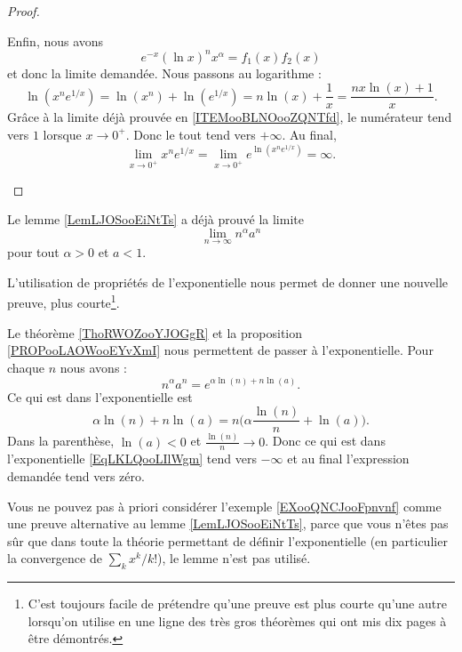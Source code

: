 \begin{proof}
\begin{subproof}
		Enfin, nous avons
		\begin{equation}
			e^{-x}(\ln x)^nx^{\alpha}=f_1(x)f_2(x)
		\end{equation}
		et donc la limite demandée.
		Nous passons au logarithme :
		\begin{equation}
			\ln(x^n e^{1/x})=\ln(x^n)+\ln( e^{1/x})=n\ln(x)+\frac{1}{ x }=\frac{ n x\ln(x)+1 }{ x }.
		\end{equation}
		Grâce à la limite déjà prouvée en \ref{ITEMooBLNOooZQNTfd}, le numérateur tend vers \( 1\) lorsque \( x\to 0^+\). Donc le tout tend vers \( +\infty\). Au final,
		\begin{equation}
			\lim_{x\to 0^+} x^n e^{1/x}=\lim_{x\to 0^+}  e^{\ln(x^n e^{1/x})}=\infty.
		\end{equation}
	\end{subproof}
\end{proof}

\begin{example}     \label{EXooQNCJooFpnvnf}
	Le lemme \ref{LemLJOSooEiNtTs} a déjà prouvé la limite
	\begin{equation}
		\lim_{n\to \infty} n^{\alpha}a^n
	\end{equation}
	pour tout \( \alpha>0\) et \( a<1\).

	L'utilisation de propriétés de l'exponentielle nous permet de donner une nouvelle preuve, plus courte\footnote{C'est toujours facile de prétendre qu'une preuve est plus courte qu'une autre lorsqu'on utilise en une ligne des très gros théorèmes qui ont mis dix pages à être démontrés.}.

	Le théorème \ref{ThoRWOZooYJOGgR} et la proposition \ref{PROPooLAOWooEYvXmI} nous permettent de passer à l'exponentielle. Pour chaque \( n\) nous avons :
	\begin{equation}        \label{EqLKLQooLIlWgm}
		n^{\alpha}a^n= e^{\alpha\ln(n)+n\ln(a)}.
	\end{equation}
	Ce qui est dans l'exponentielle est
	\begin{equation}
		\alpha\ln(n)+n\ln(a)=n\big(\alpha \frac{ \ln(n) }{ n }+\ln(a) \big).
	\end{equation}
	Dans la parenthèse, \( \ln(a)<0\) et \( \frac{ \ln(n) }{ n }\to 0\). Donc ce qui est dans l'exponentielle \eqref{EqLKLQooLIlWgm} tend vers \( -\infty\) et au final l'expression demandée tend vers zéro.
\end{example}

\begin{remark}
	Vous ne pouvez pas à priori considérer l'exemple \ref{EXooQNCJooFpnvnf} comme une preuve alternative au lemme \ref{LemLJOSooEiNtTs}, parce que vous n'êtes pas sûr que dans toute la théorie permettant de définir l'exponentielle (en particulier la convergence de \( \sum_kx^k/k!\)), le lemme n'est pas utilisé.
\end{remark}


